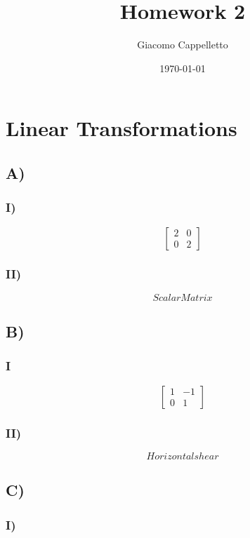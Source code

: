 \documentclass{article}
\title{Homework 2}
\author{Giacomo Cappelletto}
\date{\today}
\begin{document}
\maketitle

\section{Linear Transformations}

\subsection*{A)}
\subsubsection*{I)}
\[
	\begin{bmatrix}
		2 & 0 \\
		0 & 2
	\end{bmatrix}
\]
\subsubsection*{II)}

$$Scalar Matrix$$

\subsection*{B)}

\subsubsection*{I}

\[
	\begin{bmatrix}
		1 & -1 \\
		0 & 1
	\end{bmatrix}
\]
\subsubsection*{II)}

$$Horizontal shear$$

\subsection*{C)}

\subsubsection*{I)}
\end{document}
